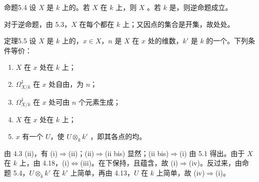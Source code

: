 \begin{SGAresult}{命题}{5.4}
设 $X$ 是 $k$ 上的。若 $X$ 在 $k$ 上，则 $X$ 。若 $k$ 是，则逆命题成立。
\end{SGAresult}
对于逆命题，由 5.3，$X$ 在每个都在 $k$ 上；又因点的集合是开集，故处处。

\begin{SGAresult}{定理}{5.5}
设 $X$ 是 $k$ 上的，$x\in X$，$n$ 是 $X$ 在 $x$ 处的维数，$k'$ 是 $k$ 的一个。下列条件等价：
\begin{enumerate}
\item[(i)] $X$ 在 $x$ 处在 $k$ 上；
\item[(ii)] $\Omega^1_{X/k}$ 在 $x$ 处自由，为 $n$；
\item[(ii bis)] $\Omega^1_{X/k}$ 在 $x$ 处可由 $n$ 个元素生成；
\item[(iii)] $X$ 在 $x$ 处在 $k$ 上；
\item[(iv)] $x$ 有一个 $U$，使 $U\otimes_k k'$ ，即其各点的均。
\end{enumerate}
\end{SGAresult}
由 4.3 (ii)，有 (i)$\Rightarrow$(ii)；(ii)$\Rightarrow$(ii bis) 显然；(ii bis)$\Rightarrow$(i) 由 5.1 得出。由于 $X$ 在 $k$ 上，由 4.18，(i)$\Leftrightarrow$(iii)。在下保持，且蕴含，故 (i)$\Rightarrow$(iv)。反过来，由命题 5.4，$U\otimes_k k'$ 在 $k'$ 上简单，再由 4.13，$U$ 在 $k$ 上简单，故 (iv)$\Rightarrow$(i)。

